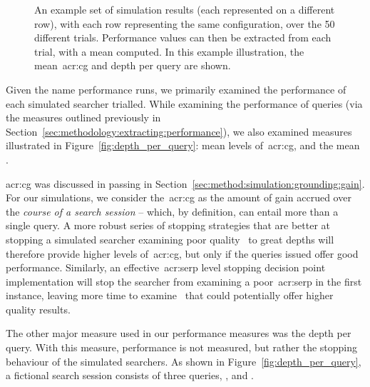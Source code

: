 \begin{figure}[t!]
    \centering
    \caption[Example of how an average of measures was computed]{An example set of simulation results (each represented on a different row), with each row representing the same configuration, over the 50 different trials. Performance values can then be extracted from each trial, with a mean computed. In this example illustration, the mean~\gls{acr:cg} and depth per query are shown.}
    \label{fig:example_sim_configuration}
\end{figure}

Given the name performance runs, we primarily examined the performance of each simulated searcher trialled. While examining the performance of queries (via the measures outlined previously in Section~\ref{sec:methodology:extracting:performance}), we also examined measures illustrated in Figure~\ref{fig:depth_per_query}: mean levels of~\gls{acr:cg}, and the mean .

\gls{acr:cg} was discussed in passing in Section~\ref{sec:method:simulation:grounding:gain}. For our simulations, we consider the~\gls{acr:cg} as the amount of gain accrued over the \emph{course of a search session} -- which, by definition, can entail more than a single query. A more robust series of stopping strategies that are better at stopping a simulated searcher examining poor quality~ to great depths will therefore provide higher levels of~\gls{acr:cg}, but only if the queries issued offer good performance. Similarly, an effective~\gls{acr:serp} level stopping decision point implementation will stop the searcher from examining a poor~\gls{acr:serp} in the first instance, leaving more time to examine~ that could potentially offer higher quality results.

The other major measure used in our performance measures was the depth per query. With this measure, performance is not measured, but rather the stopping behaviour of the simulated searchers. As shown in Figure~\ref{fig:depth_per_query}, a fictional search session consists of three queries, ,  and .

